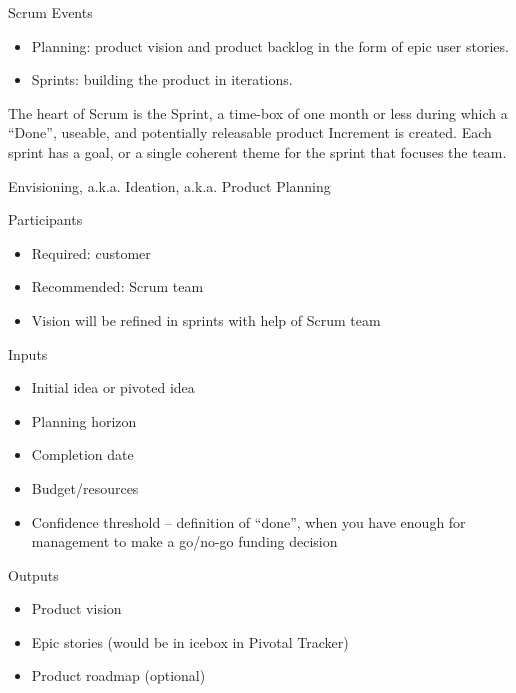 \documentclass{beamer}
\begin{document}
\begin{frame}[fragile]{Scrum Events}


\begin{itemize}
\item Planning: product vision and product backlog in the form of epic user stories.
\item Sprints: building the product in iterations.
\end{itemize}

The heart of Scrum is the Sprint, a time-box of one month or less during which a ``Done'', useable, and potentially releasable product Increment is created.  Each sprint has a goal, or a single coherent theme for the sprint that focuses the team.


\end{frame}

\begin{frame}[fragile]{Envisioning, a.k.a. Ideation, a.k.a. Product Planning}


Participants
\begin{itemize}
\item Required: customer
\item Recommended: Scrum team
\item Vision will be refined in sprints with help of Scrum team
\end{itemize}

Inputs
\begin{itemize}
\item Initial idea or pivoted idea
\item Planning horizon
\item Completion date
\item Budget/resources
\item Confidence threshold -- definition of ``done'', when you have enough for management to make a go/no-go funding decision
\end{itemize}
Outputs
\begin{itemize}
\item Product vision
\item Epic stories (would be in icebox in Pivotal Tracker)
\item Product roadmap (optional)
\end{itemize}

\end{frame}
\end{document}
